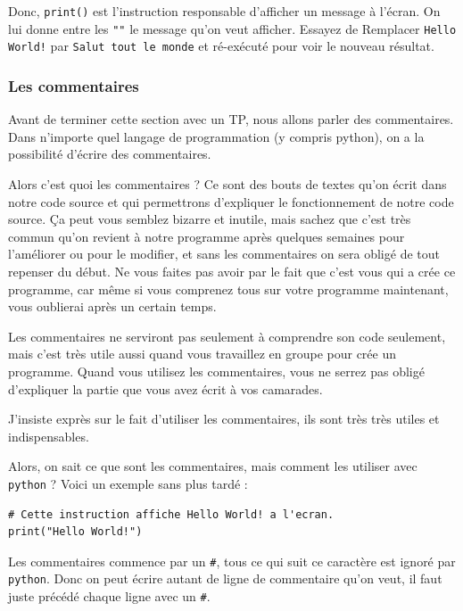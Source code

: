 \documentclass[12pt]{article}
\newcommand{\code}[1]{\colorbox{light-gray}{\texttt{#1}}}
\begin{document}
        Donc, \code{print()} est l'instruction responsable d'afficher un message à l'écran. On lui donne entre
        les \code{""} le message qu'on veut afficher.
        Essayez de Remplacer \code{Hello World!} par \code{Salut tout le monde} et ré-exécuté pour voir le nouveau résultat.

        \subsubsection{Les commentaires}
            Avant de terminer cette section avec un TP, nous allons parler des commentaires.
            Dans n'importe quel langage de programmation (y compris python), on a la possibilité d'écrire des commentaires.

            Alors c'est quoi les commentaires ? Ce sont des bouts de textes qu'on écrit dans notre code source et qui
            permettrons d'expliquer le fonctionnement de notre code source. Ça peut vous semblez bizarre et inutile, mais
            sachez que c'est très commun qu'on revient à notre programme après quelques semaines pour l'améliorer
            ou pour le modifier, et sans les commentaires on sera obligé de tout repenser du début. Ne vous faites pas
            avoir par le fait que c'est vous qui a crée ce programme, car même si vous comprenez tous sur votre
            programme maintenant, vous oublierai après un certain temps.

            Les commentaires ne serviront pas seulement à comprendre son code seulement, mais c'est très utile aussi
            quand vous travaillez en groupe pour crée un programme. Quand vous utilisez les commentaires, vous ne serrez
            pas obligé d'expliquer la partie que vous avez écrit à vos camarades.

            J'insiste exprès sur le fait d'utiliser les commentaires, ils sont très très utiles et indispensables.

            Alors, on sait ce que sont les commentaires, mais comment les utiliser avec \code{python} ? Voici
            un exemple sans plus tardé :
            \begin{lstlisting}[style=code]
# Cette instruction affiche Hello World! a l'ecran.
print("Hello World!")
            \end{lstlisting}

            Les commentaires commence par un \code{\#}, tous ce qui suit ce caractère est ignoré par \code{python}.
            Donc on peut écrire autant de ligne de commentaire qu'on veut, il faut juste précédé chaque ligne avec un
            \code{\#}.
\end{document}
